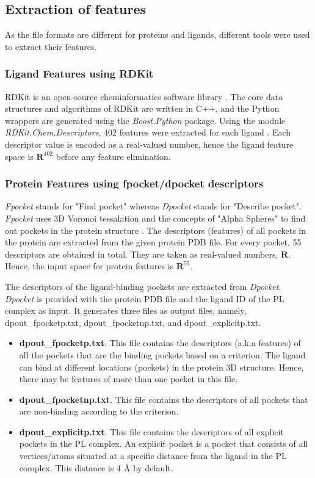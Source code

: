 \documentclass[11pt]{article}
\begin{document}
\subsection{Extraction of features}
As the file formats are different for proteins and ligands,  different tools were used to extract their features.
\subsubsection{Ligand Features using RDKit}
RDKit is an open-source cheminformatics software library \cite{rdkitofficalpage}.
The core data structures and algorithms of RDKit are written in C++, and the Python wrappers are generated using the \textit{Boost.Python} package.
Using the module \textit{RDKit.Chem.Descriptors}, $402$ features were extracted for each ligand \cite{rdkitbioinformaticsfreiburg}.
Each descriptor value is encoded as a real-valued number, hence the ligand feature space is $\mathbf{R}^{402}$ before any feature elimination.

\subsubsection{Protein Features using fpocket/dpocket descriptors}
\textit{Fpocket} stands for "Find pocket" whereas \textit{Dpocket} stands for "Describe pocket"\cite{fpocketpaper}.
\textit{Fpocket} uses 3D Voronoi tessalation and the concepts of "Alpha Spheres" to find out pockets in the protein structure \cite{fpocketmanual} \cite{voronoitesselationshortvideo}.
The descriptors (features) of all pockets in the protein are extracted from the given protein PDB file.
For every pocket,  55 descriptors are obtained in total. They are taken as real-valued numbers, $\mathbf{R}$.
Hence, the input space for protein features is $\mathbf{R}^{55}$.


The descriptors of the ligand-binding pockets are extracted from \textit{Dpocket}.
\textit{Dpocket} is provided with the protein PDB file and the ligand ID of the PL complex as input.
It generates three files as output files,  namely,  dpout\_fpocketp.txt, dpout\_fpocketnp.txt,  and  dpout\_explicitp.txt.
\begin{itemize}
\item \textbf{dpout\_fpocketp.txt}.
This file contains the descriptors (a.k.a features) of all the pockets that are the binding pockets based on a criterion.
The ligand can bind at different locations (pockets) in the protein 3D structure.
Hence,  there may be features of more than one pocket in this file.
\item \textbf{dpout\_fpocketnp.txt}.  This file contains the descriptors of all pockets that are non-binding according to the criterion.
\item \textbf{dpout\_explicitp.txt}.  This file contains the descriptors of all explicit pockets in the PL complex. An explicit pocket is a pocket that consists of all vertices/atoms situated at a specific distance from the ligand in the PL complex.
This distance is 4 \r{A} by default. 
\end{itemize}
\end{document}
